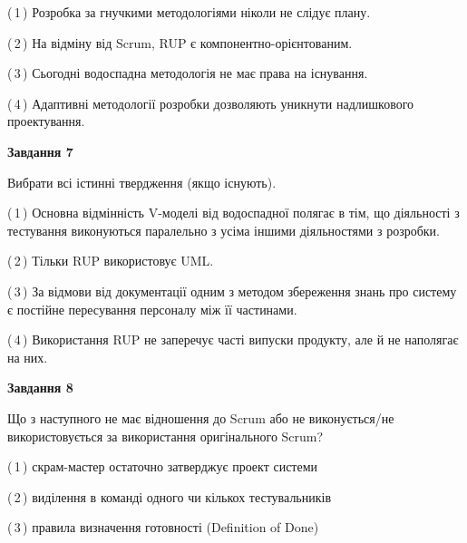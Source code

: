 \documentclass[10pt, ukrainian]{article}
\begin{document}
{\begin {large}
(\,1\,) Розробка за гнучкими методологіями ніколи не слідує плану. %



(\,2\,) На відміну від Scrum, RUP є компонентно-орієнтованим. %



(\,3\,) Сьогодні водоспадна методологія не має права на існування. %



(\,4\,) Адаптивні методології розробки дозволяють уникнути надлишкового проектування. %


{\begin {center}\textbf{Завдання 7}\end {center}}\par
Вибрати всі істинні твердження (якщо існують).\par
\vspace{2mm}



(\,1\,) Основна відмінність V-моделі від водоспадної полягає в тім, що діяльності з тестування виконуються паралельно з усіма іншими діяльностями з розробки. %



(\,2\,) Тільки RUP використовує UML.%



(\,3\,) За відмови від документації одним з методом збереження знань про систему є постійне пересування персоналу між її частинами. %



(\,4\,) Використання RUP не заперечує часті випуски продукту, але й не наполягає на них. %


{\begin {center}\textbf{Завдання 8}\end {center}}\par
Що з наступного не має відношення до Scrum або не виконується/не використовується за використання оригінального Scrum?\par
\vspace{2mm}



(\,1\,) скрам-мастер остаточно затверджує проект системи%



(\,2\,) виділення в команді одного чи кількох тестувальників%



(\,3\,) правила визначення готовності (Definition of Done) %




\end{large}}
\end{document}
